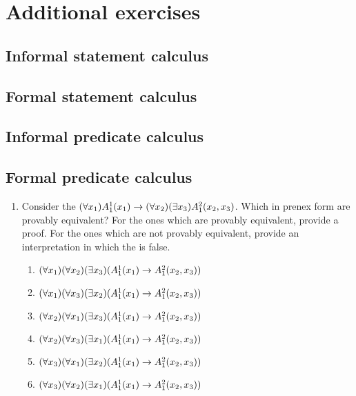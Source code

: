 \chapter{Additional exercises}

\section{Informal statement calculus}
\section{Formal statement calculus}
\section{Informal predicate calculus}
\section{Formal predicate calculus}

\begin{enumerate}
  \item %
    Consider the \wf{} \((\forall x_1)A^1_1(x_1) \rightarrow (\forall x_2)(\exists x_3)A^2_1(x_2, x_3)\). Which \wfs{} in prenex form are provably equivalent? For the ones which are provably equivalent, provide a proof. For the ones which are not provably equivalent, provide an interpretation in which the \wf{} is false.
      \begin{enumerate}
        \item \((\forall x_1)(\forall x_2)(\exists x_3)(A^1_1(x_1) \rightarrow A^2_1(x_2, x_3))\)
        \item \((\forall x_1)(\forall x_3)(\exists x_2)(A^1_1(x_1) \rightarrow A^2_1(x_2, x_3))\)
        \item \((\forall x_2)(\forall x_1)(\exists x_3)(A^1_1(x_1) \rightarrow A^2_1(x_2, x_3))\)
        \item \((\forall x_2)(\forall x_3)(\exists x_1)(A^1_1(x_1) \rightarrow A^2_1(x_2, x_3))\)
        \item \((\forall x_3)(\forall x_1)(\exists x_2)(A^1_1(x_1) \rightarrow A^2_1(x_2, x_3))\)
        \item \((\forall x_3)(\forall x_2)(\exists x_1)(A^1_1(x_1) \rightarrow A^2_1(x_2, x_3))\)
      \end{enumerate}
\end{enumerate}
